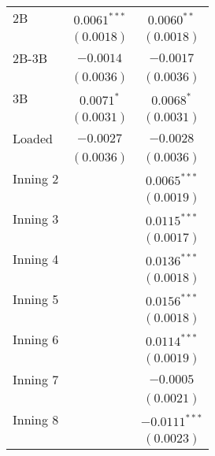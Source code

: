 \begin{tabular}{l c c}
2B                                       & $0.0061^{***}$  & $0.0060^{**}$     \\
                                         & $(0.0018)$      & $(0.0018)$        \\
2B-3B                                    & $-0.0014$       & $-0.0017$         \\
                                         & $(0.0036)$      & $(0.0036)$        \\
3B                                       & $0.0071^{*}$    & $0.0068^{*}$      \\
                                         & $(0.0031)$      & $(0.0031)$        \\
Loaded                                   & $-0.0027$       & $-0.0028$         \\
                                         & $(0.0036)$      & $(0.0036)$        \\
Inning 2                                 &                 & $0.0065^{***}$    \\
                                         &                 & $(0.0019)$        \\
Inning 3                                 &                 & $0.0115^{***}$    \\
                                         &                 & $(0.0017)$        \\
Inning 4                                 &                 & $0.0136^{***}$    \\
                                         &                 & $(0.0018)$        \\
Inning 5                                 &                 & $0.0156^{***}$    \\
                                         &                 & $(0.0018)$        \\
Inning 6                                 &                 & $0.0114^{***}$    \\
                                         &                 & $(0.0019)$        \\
Inning 7                                 &                 & $-0.0005$         \\
                                         &                 & $(0.0021)$        \\
Inning 8                                 &                 & $-0.0111^{***}$   \\
                                         &                 & $(0.0023)$        \\

\end{tabular}
